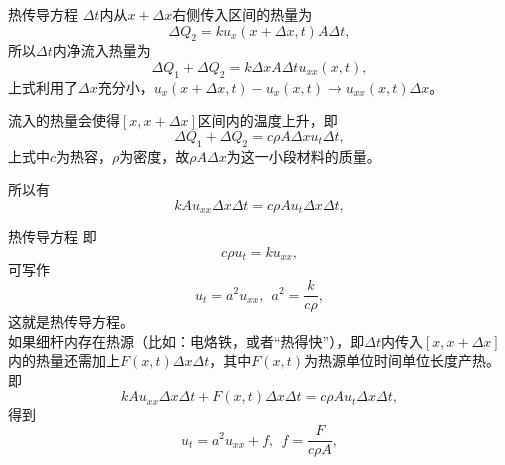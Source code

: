 \documentclass[11pt]{beamer}
\newcommand{\kong}[1][0.5]{\vspace{#1cm}}
\begin{document}
\begin{frame}{热传导方程}
$\Delta t$内从$x+\Delta x$右侧传入区间的热量为
\begin{equation}
\Delta Q_2 = k u_x(x+\Delta x, t) A \Delta t,
\end{equation}
所以$\Delta t$内净流入热量为
\begin{equation}
\Delta Q_1 + \Delta Q_2 = k \Delta x A \Delta t u_{xx}(x,t),
\end{equation}
上式利用了$\Delta x$充分小，$u_x(x+\Delta x, t) - u_x(x,t) \rightarrow u_{xx}(x,t) \Delta x$。

流入的热量会使得$[x,x+\Delta x]$区间内的温度上升，即
\begin{equation}
\Delta Q_1 + \Delta Q_2 = c \rho A \Delta x u_t \Delta t,
\end{equation}
上式中$c$为热容，$\rho$为密度，故$\rho A \Delta x$为这一小段材料的质量。

所以有
\begin{equation}
k A u_{xx} \Delta x \Delta t = c \rho A u_t \Delta x \Delta t,
\end{equation}
\end{frame}

\begin{frame}{热传导方程}
即
\begin{equation}
c \rho u_t = k u_{xx},
\end{equation}
可写作
\begin{equation}
u_t = a^2 u_{xx}, ~~ a^2 = \frac{k}{c\rho},
\end{equation}
这就是热传导方程。\\

\kong[0.5]
如果细杆内存在热源（比如：电烙铁，或者“热得快”），即$\Delta t$内传入$[x,x+\Delta x]$内的热量还需加上$F(x,t)\Delta x \Delta t$，其中$F(x,t)$为热源单位时间单位长度产热。
即
\begin{equation}
k A u_{xx} \Delta x \Delta t + F(x,t)\Delta x \Delta t = c \rho A u_t \Delta x \Delta t,
\end{equation}
得到
\begin{equation}
u_t = a^2 u_{xx} + f, ~~ f=\frac{F}{c \rho A},
\end{equation}

\end{frame}
\end{document}
